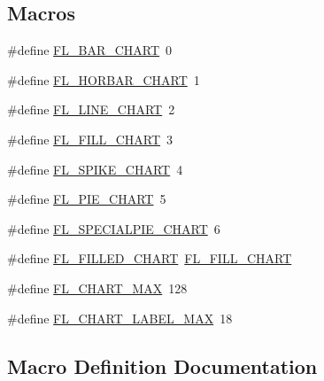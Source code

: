 \subsection*{Macros}
\begin{DoxyCompactItemize}
\item 
\#define \hyperlink{_fl___chart_8_h_a92cfb8e74da87b1cb4d159293af9f5d3}{F\+L\+\_\+\+B\+A\+R\+\_\+\+C\+H\+A\+RT}~0
\item 
\#define \hyperlink{_fl___chart_8_h_ae0ceadce7e63b440b70570feb3274b40}{F\+L\+\_\+\+H\+O\+R\+B\+A\+R\+\_\+\+C\+H\+A\+RT}~1
\item 
\#define \hyperlink{_fl___chart_8_h_afa7cee2511b14769210bb541723b716a}{F\+L\+\_\+\+L\+I\+N\+E\+\_\+\+C\+H\+A\+RT}~2
\item 
\#define \hyperlink{_fl___chart_8_h_a6c9a9c098318a50d4a94a68cf13d2030}{F\+L\+\_\+\+F\+I\+L\+L\+\_\+\+C\+H\+A\+RT}~3
\item 
\#define \hyperlink{_fl___chart_8_h_abd70715712e4de0ff0c25ed46c6e21a5}{F\+L\+\_\+\+S\+P\+I\+K\+E\+\_\+\+C\+H\+A\+RT}~4
\item 
\#define \hyperlink{_fl___chart_8_h_a8fd23d4eaebaadfa989a6078f4c5c31f}{F\+L\+\_\+\+P\+I\+E\+\_\+\+C\+H\+A\+RT}~5
\item 
\#define \hyperlink{_fl___chart_8_h_a1566be9d3aa4f0eb3c5db925c64a45cd}{F\+L\+\_\+\+S\+P\+E\+C\+I\+A\+L\+P\+I\+E\+\_\+\+C\+H\+A\+RT}~6
\item 
\#define \hyperlink{_fl___chart_8_h_a84ca774c6f5ce1152d9a657c07a95947}{F\+L\+\_\+\+F\+I\+L\+L\+E\+D\+\_\+\+C\+H\+A\+RT}~\hyperlink{_fl___chart_8_h_a6c9a9c098318a50d4a94a68cf13d2030}{F\+L\+\_\+\+F\+I\+L\+L\+\_\+\+C\+H\+A\+RT}
\item 
\#define \hyperlink{_fl___chart_8_h_a072e60b2b358daaa2241157a552b6f4b}{F\+L\+\_\+\+C\+H\+A\+R\+T\+\_\+\+M\+AX}~128
\item 
\#define \hyperlink{_fl___chart_8_h_adffa44e3e33b05d236be442a3f96cb19}{F\+L\+\_\+\+C\+H\+A\+R\+T\+\_\+\+L\+A\+B\+E\+L\+\_\+\+M\+AX}~18
\end{DoxyCompactItemize}


\subsection{Macro Definition Documentation}
\mbox{\label{_fl___chart_8_h_a92cfb8e74da87b1cb4d159293af9f5d3}} 
